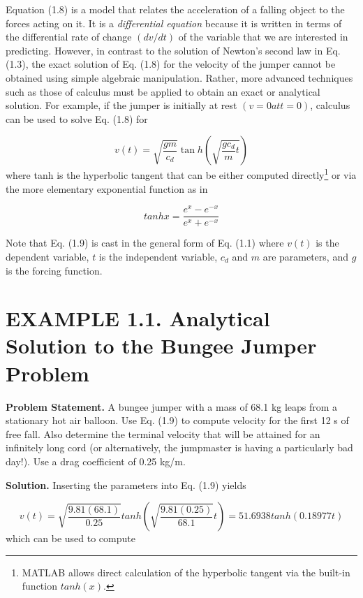\documentclass[../main.tex]{subfiles}
\begin{document}
Equation (1.8) is a model that relates the acceleration of a falling object to the forces
acting on it. It is a \textsl{differential equation} because it is written in terms of the differential rate
of change $(dv/dt)$ of the variable that we are interested in predicting. However, in contrast
to the solution of Newton's second law in Eq. (1.3), the exact solution of Eq. (1.8) for the
velocity of the jumper cannot be obtained using simple algebraic manipulation. Rather,
more advanced techniques such as those of calculus must be applied to obtain an exact or
analytical solution. For example, if the jumper is initially at rest $(v = 0 at t = 0)$, calculus
can be used to solve Eq. (1.8) for

\begin{equation}
\tag{1.9}
v(t)=\sqrt{\dfrac{gm}{c_d}}\tan h \left(\sqrt{\dfrac{gc_d}{m}t}\right)
\end{equation}
where tanh is the hyperbolic tangent that can be either computed directly\footnote{{}MATLAB allows direct calculation of the hyperbolic tangent via the built-in function $tanh(x)$.} or via the more
elementary exponential function as in

\begin{equation}
\tag{1.10}
tanhx=\dfrac{e^x-e^{-x}}{e^x+e^{-x}}
\end{equation}

Note that Eq. (1.9) is cast in the general form of Eq. (1.1) where $v(t)$ is the dependent
variable, $t$ is the independent variable, $c_d$ and $m$ are parameters, and $g$ is the forcing function.


\bigskip
\section*{EXAMPLE 1.1. Analytical Solution to the Bungee Jumper Problem }
\label{sec:sec3}
\textbf{Problem Statement.} A bungee jumper with a mass of 68.1 kg leaps from a stationary hot
air balloon. Use Eq. (1.9) to compute velocity for the first 12 s of free fall. Also determine
the terminal velocity that will be attained for an infinitely long cord (or alternatively, the
jumpmaster is having a particularly bad day!). Use a drag coefficient of 0.25 kg/m.

\textbf{Solution.} Inserting the parameters into Eq. (1.9) yields

$$ 
v(t) =\sqrt{\dfrac{9.81(68.1)}{0.25}}tanh \left(\sqrt{\dfrac{9.81(0.25)}{68.1}}t\right)= 51.6938 tanh(0.18977t)
$$
\newpage
which can be used to compute
\end{document}
